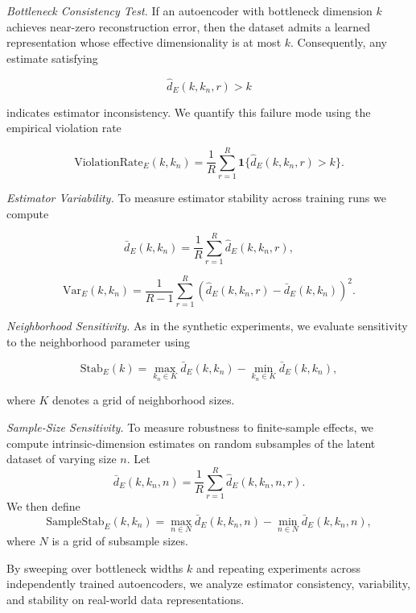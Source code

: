 \documentclass[11pt]{article}
\begin{document}
\emph{Bottleneck Consistency Test.}  
If an autoencoder with bottleneck dimension $k$ achieves near-zero reconstruction error, then the dataset admits a learned representation whose effective dimensionality is at most $k$. 
Consequently, any estimate satisfying

\[
\hat d_E(k,k_n,r) > k
\]

indicates estimator inconsistency. 
We quantify this failure mode using the empirical violation rate

\[
\mathrm{ViolationRate}_E(k,k_n)
=
\frac{1}{R}
\sum_{r=1}^{R}
\mathbf{1}\{\hat d_E(k,k_n,r) > k\}.
\]

\emph{Estimator Variability.}  
To measure estimator stability across training runs we compute

\[
\bar d_E(k,k_n)
=
\frac{1}{R}
\sum_{r=1}^{R}
\hat d_E(k,k_n,r),
\]

\[
\mathrm{Var}_E(k,k_n)
=
\frac{1}{R-1}
\sum_{r=1}^{R}
\left(
\hat d_E(k,k_n,r)
-
\bar d_E(k,k_n)
\right)^2 .
\]

\emph{Neighborhood Sensitivity.}  
As in the synthetic experiments, we evaluate sensitivity to the neighborhood parameter using

\[
\mathrm{Stab}_E(k)
=
\max_{k_n \in K}
\bar d_E(k,k_n)
-
\min_{k_n \in K}
\bar d_E(k,k_n),
\]

where $K$ denotes a grid of neighborhood sizes.

\emph{Sample-Size Sensitivity.}
To measure robustness to finite-sample effects, we compute intrinsic-dimension estimates on random subsamples of the latent dataset of varying size $n$. Let
\[
\bar d_E(k,k_n,n)
=
\frac{1}{R}\sum_{r=1}^R \hat d_E(k,k_n,n,r).
\]
We then define
\[
\mathrm{SampleStab}_E(k,k_n)
=
\max_{n\in N}\bar d_E(k,k_n,n)
-
\min_{n\in N}\bar d_E(k,k_n,n),
\]
where $N$ is a grid of subsample sizes.

By sweeping over bottleneck widths $k$ and repeating experiments across independently trained autoencoders, we analyze estimator consistency, variability, and stability on real-world data representations.


\end{document}
